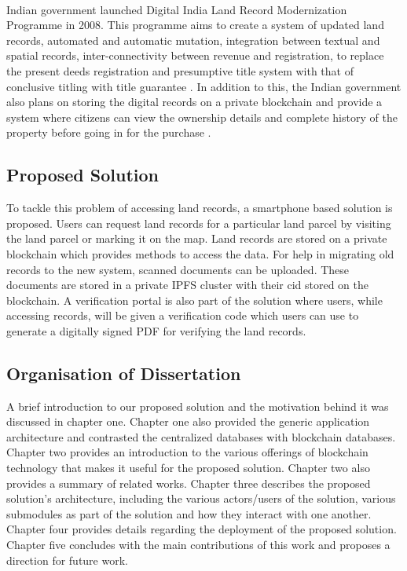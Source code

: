 \documentclass{article}
\begin{document}
        \paragraph{}
        Indian government launched Digital India Land Record Modernization Programme in 2008. This programme aims to create a system of updated land records, automated and automatic mutation, integration between textual and spatial records, inter-connectivity between revenue and registration, to replace the present deeds registration and presumptive title system with that of conclusive titling with title guarantee \cite{dilrmp}. In addition to this, the Indian government also plans on storing the digital records on a private blockchain and provide a system where citizens can view the ownership details and complete history of the property before going in for the purchase \cite{blockchaingovin}.  

    \subsection{Proposed Solution}
        To tackle this problem of accessing land records, a smartphone based solution is proposed. Users can request land records for a particular land parcel by visiting the land parcel or marking it on the map. Land records are stored on a private blockchain which provides methods to access the data. For help in migrating old records to the new system, scanned documents can be uploaded. These documents are stored in a private IPFS cluster with their \gls{cid} stored on the blockchain. A verification portal is also part of the solution where users, while accessing records, will be given a verification code which users can use to generate a digitally signed PDF for verifying the land records. 
        
    \subsection{Organisation of Dissertation}
        A brief introduction to our proposed solution and the motivation behind it was discussed in chapter one. Chapter one also provided the generic application architecture and contrasted the centralized databases with blockchain databases. Chapter two provides an introduction to the various offerings of blockchain technology that makes it useful for the proposed solution. Chapter two also provides a summary of related works. Chapter three describes the proposed solution's architecture, including the various actors/users of the solution, various submodules as part of the solution and how they interact with one another. Chapter four provides details regarding the deployment of the proposed solution. Chapter five concludes with the main contributions of this work and proposes a direction for future work.
        
\end{document}
